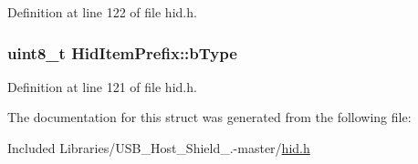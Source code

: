 \-Definition at line 122 of file hid.\-h.

\hypertarget{struct_hid_item_prefix_a16874c73fdb809e4c46407ca83684927}{
\subsubsection[{b\-Type}]{\setlength{\rightskip}{0pt plus 5cm}uint8\-\_\-t {\bf \-Hid\-Item\-Prefix\-::b\-Type}}}\label{struct_hid_item_prefix_a16874c73fdb809e4c46407ca83684927}


\-Definition at line 121 of file hid.\-h.



\-The documentation for this struct was generated from the following file\-:\begin{DoxyCompactItemize}
\item 
\-Included Libraries/\-U\-S\-B\-\_\-\-Host\-\_\-\-Shield\-\_.-\/master/\hyperlink{hid_8h}{hid.\-h}\end{DoxyCompactItemize}
